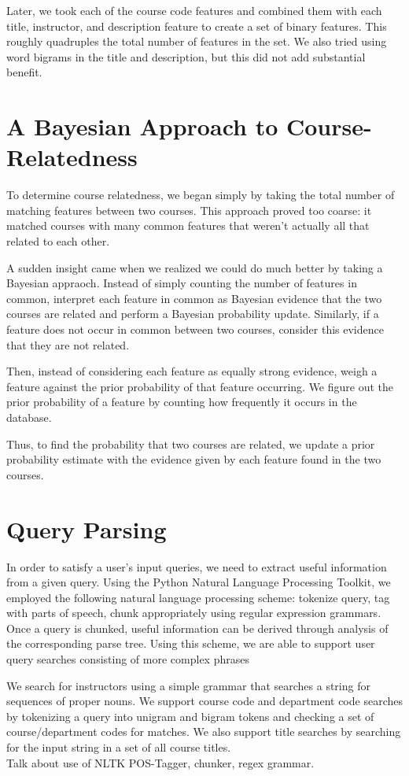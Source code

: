 \documentclass[12pt]{article}
\begin{document}
Later, we took each of the course code features and combined them with
each title, instructor, and description feature to create a set of
binary features. This roughly quadruples the total number of features
in the set. We also tried using word bigrams in the title and
description, but this did not add substantial benefit.

\section*{A Bayesian Approach to Course-Relatedness}

To determine course relatedness, we began simply by taking the total
number of matching features between two courses. This approach proved
too coarse: it matched courses with many common features that weren't
actually all that related to each other.

A sudden insight came when we realized we could do much better by
taking a Bayesian appraoch. Instead of simply counting the number of
features in common, interpret each feature in common as Bayesian
evidence that the two courses are related and perform a Bayesian
probability update. Similarly, if a feature does not occur in common
between two courses, consider this evidence that they are not related.

Then, instead of considering each feature as equally strong evidence,
weigh a feature against the prior probability of that feature
occurring. We figure out the prior probability of a feature by
counting how frequently it occurs in the database.

Thus, to find the probability that two courses are related, we update
a prior probability estimate with the evidence given by each feature
found in the two courses.

\section*{Query Parsing}
In order to satisfy a user's input queries, we need to extract useful
information from a given query. Using the Python Natural Language
Processing Toolkit, we employed the following natural language
processing scheme: tokenize query, tag with parts of speech, chunk
appropriately using regular expression grammars. Once a query is
chunked, useful information can be derived through analysis of the
corresponding parse tree. Using this scheme, we are able to support
user query searches consisting of more complex phrases

We search for instructors using a simple grammar that searches a string for sequences of proper nouns. We support course code and department code searches by tokenizing a query into unigram and bigram tokens and checking a set of course/department codes for matches. We also support title searches by searching for the input string in a set of all course titles.\\
Talk about use of NLTK POS-Tagger, chunker, regex grammar.
\end{document}
